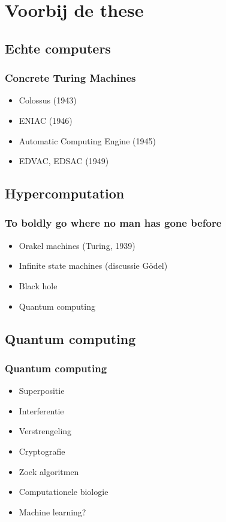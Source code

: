 \documentclass[handout]{beamer}
\begin{document}
\section{Voorbij de these}
\subsection{Echte computers}
\begin{frame}{}
    \frametitle{Concrete Turing Machines}
    \begin{itemize}
        \item<2-> Colossus (1943)
        \item<3-> ENIAC (1946)
        \item<4-> Automatic Computing Engine (1945)
        \item<5-> EDVAC, EDSAC (1949)
    \end{itemize}

\end{frame}

\subsection{Hypercomputation}
\begin{frame}{}
    \frametitle{To boldly go where no man has gone before}

    \begin{itemize}
        \item<2-> Orakel machines (Turing, 1939)
        \item<3-> Infinite state machines (discussie Gödel)
        \item<4-> Black hole
        \item<5-> Quantum computing 
    \end{itemize}
\end{frame}

\subsection{Quantum computing}
\begin{frame}
    \frametitle{Quantum computing}

    \begin{itemize}
        \item<2-> Superpositie
        \item<3-> Interferentie
        \item<4-> Verstrengeling
    \end{itemize}

    \vspace{0.5cm}
    \begin{itemize}
        \item<6-> Cryptografie
        \item<7-> Zoek algoritmen
        \item<8-> Computationele biologie
        \item<9-> Machine learning?
    \end{itemize}
\end{frame}
\end{document}
